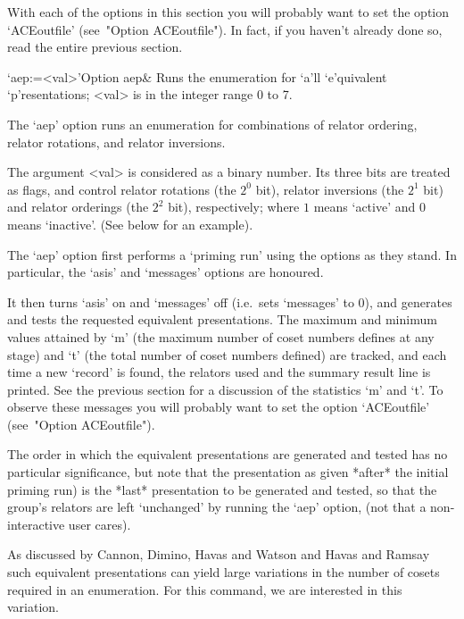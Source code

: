 
With each of the options in this section you will probably want to set
the option `ACEoutfile' (see~"Option ACEoutfile").  In  fact,  if  you
haven't already done so,  read  the  entire  previous  section.

\beginitems

\>`aep:=<val>'{Option aep}&
Runs  the enumeration for `a'll `e'quivalent `p'resentations;
<val> is in the integer range 0 to 7.

\enditems

The `aep' option runs  an  enumeration  for  combinations  of  relator
ordering, relator rotations, and relator inversions.

The argument <val> is considered as a binary number.  Its  three  bits
are treated as flags, and control relator rotations (the  $2^0$  bit),
relator inversions (the $2^1$ bit) and relator  orderings  (the  $2^2$
bit),  respectively;  where  $1$  means  \lq{}active'  and  $0$  means
\lq{}inactive'. (See below for an example).

The `aep' option first performs a \lq{}priming run' using the  options
as they stand. In particular, the `asis' and  `messages'  options  are
honoured.

It then turns `asis' on and `messages' off  (i.e.~sets  `messages'  to
0), and generates and tests the  requested  equivalent  presentations.
The maximum and minimum values attained by `m' (the maximum number  of
coset numbers defines at any stage) and `t' (the total number of coset
numbers defined) are tracked, and each  time  a  new  \lq{}record'  is
found, the relators used and the summary result line is  printed.  See
the previous section for a discussion of the statistics `m'  and  `t'.
To observe these messages you will probably want  to  set  the  option
`ACEoutfile' (see~"Option ACEoutfile").

The order in which the  equivalent  presentations  are  generated  and
tested has no particular significance, but note that the  presentation
as given *after* the initial priming run) is the  *last*  presentation
to be generated and tested, so that  the  group's  relators  are  left
`unchanged' by running the `aep' option, (not that  a  non-interactive
user cares).

As discussed by Cannon, Dimino, Havas  and  Watson  \cite{CDHW73}  and
Havas and Ramsay \cite{HR99b} such equivalent presentations can  yield
large variations in the number of cosets required in  an  enumeration.
For this command, we are interested in this variation.


